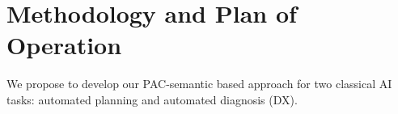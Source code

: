 \documentclass[12pt]{article}
\newcommand{\note}[1]{\textbf{\textit{#1}}}
\begin{document}

  







\section{Methodology and Plan of Operation}
\label{sec:methodology}


We propose to develop our PAC-semantic based approach for two classical AI tasks: automated planning and automated diagnosis (DX). %

\end{document}
